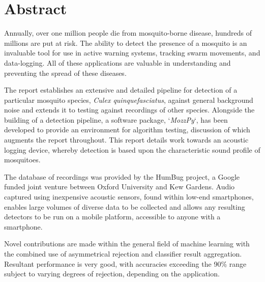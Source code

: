 \section*{Abstract}
   Annually, over one million people die from mosquito-borne disease, hundreds of millions are put at risk. The ability to detect the presence of a mosquito is an invaluable tool for use in active warning systems, tracking swarm movements, and data-logging. All of these applications are valuable in understanding and preventing the spread of these diseases. 
    
    The report establishes an extensive and detailed pipeline for detection of a particular mosquito species, \textit{Culex quinquefasciatus}, against general background noise and extends it to testing against recordings of other species. Alongside the building of a detection pipeline, a software package, `\textit{MozzPy}`, has been developed to provide an environment for algorithm testing, discussion of which augments the report throughout. This report details work towards an acoustic logging device, whereby detection is based upon the characteristic sound profile of mosquitoes.
    
    The database of recordings was provided by the HumBug project, a Google funded joint venture between Oxford University and Kew Gardens. Audio captured using inexpensive acoustic sensors, found within low-end smartphones, enables large volumes of diverse data to be collected and allows any resulting detectors to be run on a mobile platform, accessible to anyone with a smartphone.
    
    Novel contributions are made within the general field of machine learning with the combined use of asymmetrical rejection and classifier result aggregation. Resultant performance is very good, with accuracies exceeding the 90\% range subject to varying degrees of rejection, depending on the application.